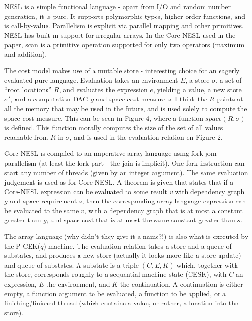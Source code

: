 \documentclass[a4paper, oneside, final]{memoir}
\begin{document}
NESL is a simple functional language - apart from I/O and random
number generation, it is pure.  It supports polymorphic types,
higher-order functions, and is call-by-value.  Parallelism is explicit
via parallel mapping and other primitives.  NESL has built-in support
for irregular arrays.  In the Core-NESL used in the paper, scan is a
primitive operation supported for only two operators (maximum and
addition).

The cost model makes use of a mutable store - interesting choice for
an eagerly evaluated pure language.  Evaluation takes an environment
$E$, a store $\sigma$, a set of ``root locations'' $R$, and evaluates
the expression $e$, yielding a value, a new store $\sigma'$, and a
computation DAG $g$ and space cost measure $s$.  I think the $R$
points at all the memory that may be used in the future, and is used
solely to compute the space cost measure.  This can be seen in Figure
4, where a function $space(R,\sigma)$ is defined.  This function
morally computes the size of the set of all values reachable from $R$
in $\sigma$, and is used in the evaluation relation on Figure 2.

Core-NESL is compiled to an imperative array language using fork-join
parallelism (at least the fork part - the join is implicit).  One fork
instruction can start any number of threads (given by an integer
argument).  The same evaluation judgement is used as for Core-NESL.  A
theorem is given that states that if a Core-NESL expression can be
evaluated to some result $v$ with dependency graph $g$ and space
requirement $s$, then the corresponding array language expression can
be evaluated to the same $v$, with a dependency graph that is at most
a constant greater than $g$, and space cost that is at most the same
constant greater than $s$.

The array language (why didn't they give it a name?!) is also what is
executed by the P-CEK($q$) machine.  The evaluation relation takes a
store and a queue of substates, and produces a new store (actually it
looks more like a store update) and queue of substates.  A substate is
a triple $(C,E,K)$ which, together with the store, corresponds roughly
to a sequential machine state (CESK), with $C$ an expression, $E$ the
environment, and $K$ the continuation.  A continuation is either
empty, a function argument to be evaluated, a function to be applied,
or a finishing/finished thread (which contains a value, or rather, a
location into the store).
\end{document}
